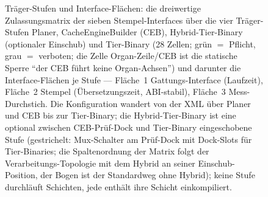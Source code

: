 \begin{nurlang}
\begin{figure}[htbp]
\caption{Träger-Stufen und Interface-Flächen: die dreiwertige Zulassungsmatrix der sieben Stempel-Interfaces über die vier Träger-Stufen Planer, CacheEngineBuilder (CEB), Hybrid-Tier-Binary (optionaler Einschub) und Tier-Binary (28 Zellen; grün $=$ Pflicht, grau $=$ verboten; die Zelle Organ-Zeile/CEB ist die statische Sperre \enquote{der CEB führt keine Organ-Achsen}) und darunter die Interface-Flächen je Stufe --- Fläche~1 Gattungs-Interface (Laufzeit), Fläche~2 Stempel (Übersetzungszeit, ABI-stabil), Fläche~3 Mess-Durchstich. Die Konfiguration wandert von der XML über Planer und CEB bis zur Tier-Binary; die Hybrid-Tier-Binary ist eine optional zwischen CEB-Prüf-Dock und Tier-Binary eingeschobene Stufe (gestrichelt: Mux-Schalter am Prüf-Dock mit Dock-Slots für Tier-Binaries; die Spaltenordnung der Matrix folgt der Verarbeitungs-Topologie mit dem Hybrid an seiner Einschub-Position, der Bogen ist der Standardweg ohne Hybrid); keine Stufe durchläuft Schichten, jede enthält ihre Schicht einkompiliert.}\label{fig:traeger-flaechen}
\end{figure}
\end{nurlang}
